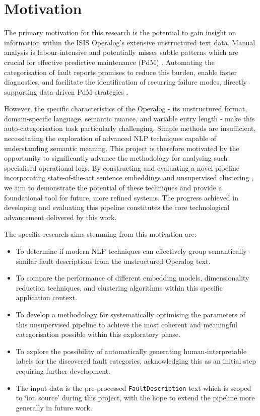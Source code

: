 \documentclass[10pt,oneside]{report}
\begin{document}
\section{Motivation}

The primary motivation for this research is the potential to gain insight on information within the ISIS Operalog's extensive unstructured text data. Manual analysis is labour-intensive and potentially misses subtle patterns which are crucial for effective predictive maintenance (PdM) \cite{usuga2022using, borgi2017data, susto2012predictive, susto2016dealing}. Automating the categorisation of fault reports promises to reduce this burden, enable faster diagnostics, and facilitate the identification of recurring failure modes, directly supporting data-driven PdM strategies \cite{nota2022text, abijith2023large, carvalho2019systematic}.

However, the specific characteristics of the Operalog - its unstructured format, domain-specific language, semantic nuance, and variable entry length - make this auto-categorisation task particularly challenging. Simple methods are insufficient, necessitating the exploration of advanced NLP techniques capable of understanding semantic meaning. This project is therefore motivated by the opportunity to significantly advance the methodology for analysing such specialised operational logs. By constructing and evaluating a novel pipeline incorporating state-of-the-art sentence embeddings \cite{song2020mpnet, nussbaum2024nomic} and unsupervised clustering \cite{kmedoids, ester1996density, campello2013density}, we aim to demonstrate the potential of these techniques and provide a foundational tool for future, more refined systems. The progress achieved in developing and evaluating this pipeline constitutes the core technological advancement delivered by this work.

The specific research aims stemming from this motivation are:

\begin{itemize}
    \item To determine if modern NLP techniques can effectively group semantically similar fault descriptions from the unstructured Operalog text.
    \item To compare the performance of different embedding models, dimensionality reduction techniques, and clustering algorithms within this specific application context.
    \item To develop a methodology for systematically optimising the parameters of this unsupervised pipeline to achieve the most coherent and meaningful categorisation possible within this exploratory phase.
    \item To explore the possibility of automatically generating human-interpretable labels for the discovered fault categories, acknowledging this as an initial step requiring further development.
    \item The input data is the pre-processed \texttt{FaultDescription} text which is scoped to `ion source' during this project, with the hope to extend the pipeline more generally in future work.
\end{itemize}
\end{document}
